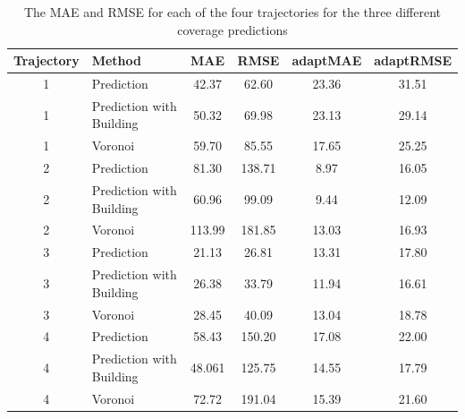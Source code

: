 \documentclass[twocolumn]{bmcart}%
\begin{document}
\begin{backmatter}
	
	\begin{table}[h]
		\caption{The MAE and RMSE for each of the four trajectories for the three different coverage predictions}
		\begin{tabular}{|c|p{2cm}|c|c|c|c|}
			\hline
			\textbf{Trajectory} & \textbf{Method}          & \textbf{MAE} & \textbf{RMSE} & \textbf{adaptMAE} & \textbf{adaptRMSE} \\ \hline
			1                   & Prediction               & 42.37        & 62.60         & 23.36             & 31.51              \\  \hline %
			1                   & Prediction with Building & 50.32        & 69.98         & 23.13             & 29.14              \\  \hline  %
			1                   & Voronoi                  & 59.70        & 85.55         & 17.65             & 25.25              \\  \hline%
			2                   & Prediction               & 81.30        & 138.71        & 8.97              & 16.05              \\ \hline %
			2                   & Prediction with Building & 60.96        & 99.09         & 9.44              & 12.09              \\   \hline%
			2                   & Voronoi                  & 113.99       & 181.85        & 13.03             & 16.93              \\  \hline %
			3                   & Prediction               & 21.13        & 26.81         & 13.31             & 17.80              \\   \hline%
			3                   & Prediction with Building & 26.38        & 33.79         & 11.94             & 16.61              \\   \hline%
			3                   & Voronoi                  & 28.45        & 40.09         & 13.04             & 18.78              \\  \hline%
			4                   & Prediction               & 58.43        & 150.20        & 17.08             & 22.00              \\  \hline%
			4                   & Prediction with Building & 48.061       & 125.75        & 14.55             & 17.79              \\   \hline%
			4                   & Voronoi                  & 72.72        & 191.04        & 15.39             & 21.60              \\  \hline %
		\end{tabular}
		\label{table:results}
	\end{table}
	

\end{backmatter}
\end{document}
